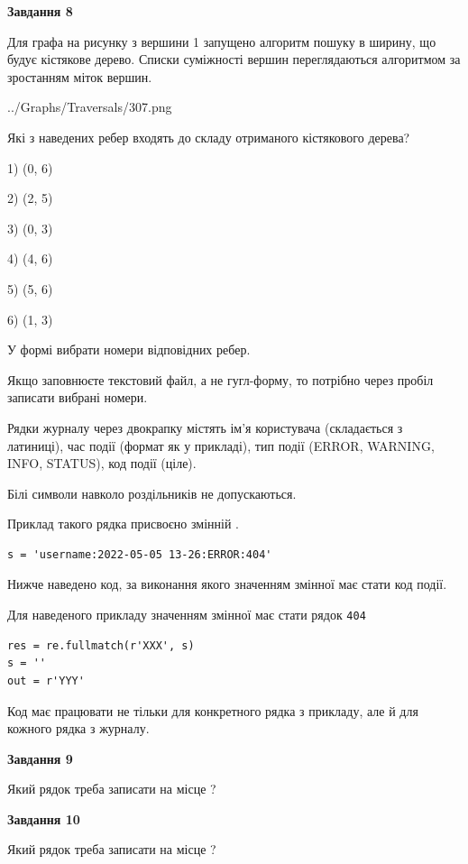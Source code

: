 \documentclass[12pt, ukrainian]{article}
\def\code#1{\Verb!#1!}
\begin{document}
{\begin {large}
{\begin {center}\textbf{Завдання 8}\end {center}}\par
Для графа на рисунку з вершини 1 запущено алгоритм пошуку в ширину, що будує кістякове дерево. Списки суміжності вершин переглядаються алгоритмом за зростанням міток вершин.\par
\begin{center}
	{../Graphs/Traversals/307.png}
\end{center}
\par Які з наведених ребер входять до складу отриманого кістякового дерева?\par
1) (0, 6)\par
2) (2, 5)\par
3) (0, 3)\par
4) (4, 6)\par
5) (5, 6)\par
6) (1, 3)\par
{\vskip 15pt} У формі вибрати номери відповідних ребер.


Якщо заповнюєте текстовий файл, а не гугл-форму, то потрібно через пробіл записа\-ти вибрані номери.\par
\newpage


Рядки журналу через двокрапку містять ім'я користувача (складається з латиниці), час події (фор\-мат як у прикладі), тип події (ERROR, WARNING, INFO, STATUS), код події (ціле).

Білі символи навколо роздільників не допускаються.

Приклад такого рядка присвоєно змінній .



\begin{verbatim}
s = 'username:2022-05-05 13-26:ERROR:404'
\end{verbatim}


Нижче наведено код, за виконання якого значенням змінної  має стати код події.

Для наведеного прикладу значенням змінної  має стати рядок \code{404}



\begin{verbatim}
res = re.fullmatch(r'XXX', s)
s = ''
out = r'YYY'
\end{verbatim}


Код має працювати не тільки для конкретного рядка з прикладу, але й для кожного рядка з журналу.

{\begin {center}\textbf{Завдання 9}\end {center}}\par
Який рядок треба записати на місце  ?\par
\vspace{5mm}


{\begin {center}\textbf{Завдання 10}\end {center}}\par
Який рядок треба записати на місце  ?\par


\newpage


\end {large}}
\end{document}
